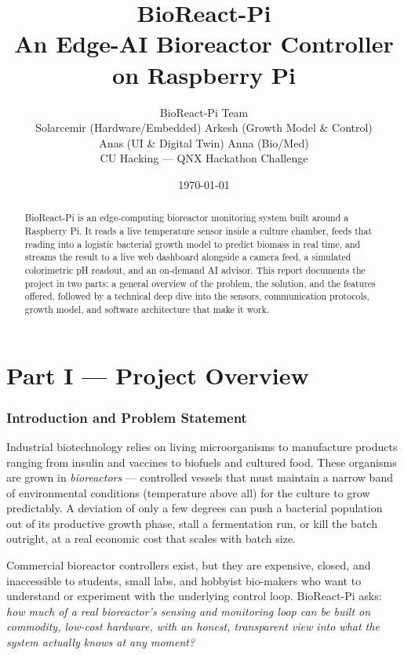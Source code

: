 \documentclass[11pt]{article}
\title{\textbf{BioReact-Pi}\\[4pt]\Large An Edge-AI Bioreactor Controller on Raspberry Pi}
\author{BioReact-Pi Team \\ \small Solarcemir (Hardware/Embedded) \; \textbar\; Arkesh (Growth Model \& Control) \\ \small Anas (UI \& Digital Twin) \; \textbar\; Anna (Bio/Med) \\[4pt] \small CU Hacking --- QNX Hackathon Challenge}
\date{\today}
\begin{document}
\maketitle
\thispagestyle{empty}

\begin{abstract}
\noindent
BioReact-Pi is an edge-computing bioreactor monitoring system built around a Raspberry Pi. It reads a live temperature sensor inside a culture chamber, feeds that reading into a logistic bacterial growth model to predict biomass in real time, and streams the result to a live web dashboard alongside a camera feed, a simulated colorimetric pH readout, and an on-demand AI advisor. This report documents the project in two parts: a general overview of the problem, the solution, and the features offered, followed by a technical deep dive into the sensors, communication protocols, growth model, and software architecture that make it work.
\end{abstract}

\tableofcontents
\newpage

\part*{Part I --- Project Overview}

\section{Introduction and Problem Statement}

Industrial biotechnology relies on living microorganisms to manufacture products ranging from insulin and vaccines to biofuels and cultured food. These organisms are grown in \emph{bioreactors} --- controlled vessels that must maintain a narrow band of environmental conditions (temperature above all) for the culture to grow predictably. A deviation of only a few degrees can push a bacterial population out of its productive growth phase, stall a fermentation run, or kill the batch outright, at a real economic cost that scales with batch size.

Commercial bioreactor controllers exist, but they are expensive, closed, and inaccessible to students, small labs, and hobbyist bio-makers who want to understand or experiment with the underlying control loop. BioReact-Pi asks: \emph{how much of a real bioreactor's sensing and monitoring loop can be built on commodity, low-cost hardware, with an honest, transparent view into what the system actually knows at any moment?}
\end{document}

